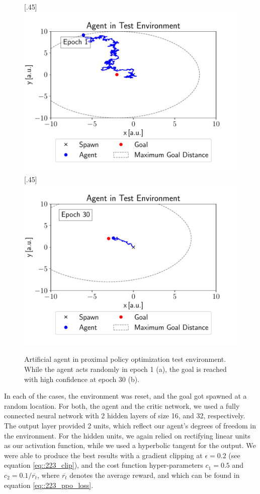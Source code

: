 \begin{figure}[h!]
	\centering
	[.45\linewidth]{\includegraphics[scale=.45]{chapters/04_experiments/02_autonomous_walking/epoch_1.pdf}}	
	[.45\linewidth]{\includegraphics[scale=.45]{chapters/04_experiments/02_autonomous_walking/epoch_30.pdf}}
	\caption{Artificial agent in proximal policy optimization test environment. While the agent acts randomly in epoch 1 (a), the goal is reached with high confidence at epoch 30 (b).}	
	\label{fig::425_ppo_env}
\end{figure} 
In each of the cases, the environment was reset, and the goal got spawned at a random location. For both, the agent and the critic network, we used a fully connected neural network with 2 hidden layers of size 16, and 32, respectively. The output layer provided 2 units, which reflect our agent's degrees of freedom in the environment. For the hidden units, we again relied on rectifying linear units as our activation function, while we used a hyperbolic tangent for the output. We were able to produce the best results with a gradient clipping at $\epsilon=0.2$ (see equation \ref{eq::223_clip}), and the cost function hyper-parameters $c_1 = 0.5$ and $c_2 = 0.1/\overline{r_t}$, where $\overline{r_t}$ denotes the average reward, and which can be found in equation \ref{eq::223_ppo_loss}. 
